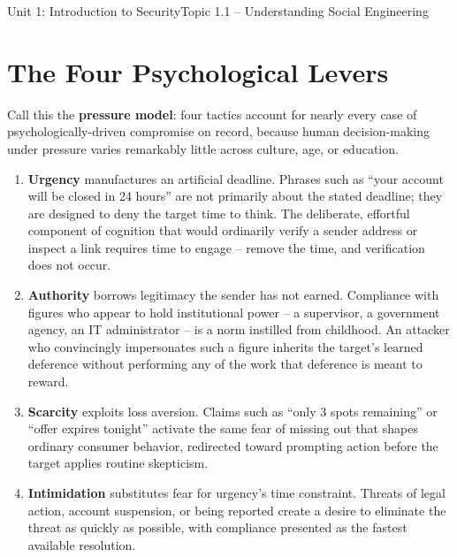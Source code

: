 \begin{apalignment}{Unit 1: Introduction to Security}{Topic 1.1 -- Understanding Social Engineering}
\begin{apobjectives}
\end{apobjectives}
\end{apalignment}

\section{The Four Psychological Levers}

Call this the \textbf{pressure model}: four tactics account for nearly every case of
psychologically-driven compromise on record, because human decision-making under pressure varies
remarkably little across culture, age, or education.

\begin{enumerate}
\item \textbf{Urgency} manufactures an artificial deadline. Phrases such as ``your account will be
closed in 24 hours'' are not primarily about the stated deadline; they are designed to deny the
target time to think. The deliberate, effortful component of cognition that would ordinarily
verify a sender address or inspect a link requires time to engage -- remove the time, and
verification does not occur.
\item \textbf{Authority} borrows legitimacy the sender has not earned. Compliance with figures who
appear to hold institutional power -- a supervisor, a government agency, an IT administrator -- is
a norm instilled from childhood. An attacker who convincingly impersonates such a figure inherits
the target's learned deference without performing any of the work that deference is meant to
reward.
\item \textbf{Scarcity} exploits loss aversion. Claims such as ``only 3 spots remaining'' or
``offer expires tonight'' activate the same fear of missing out that shapes ordinary consumer
behavior, redirected toward prompting action before the target applies routine skepticism.
\item \textbf{Intimidation} substitutes fear for urgency's time constraint. Threats of legal
action, account suspension, or being reported create a desire to eliminate the threat as quickly
as possible, with compliance presented as the fastest available resolution.
\end{enumerate}

